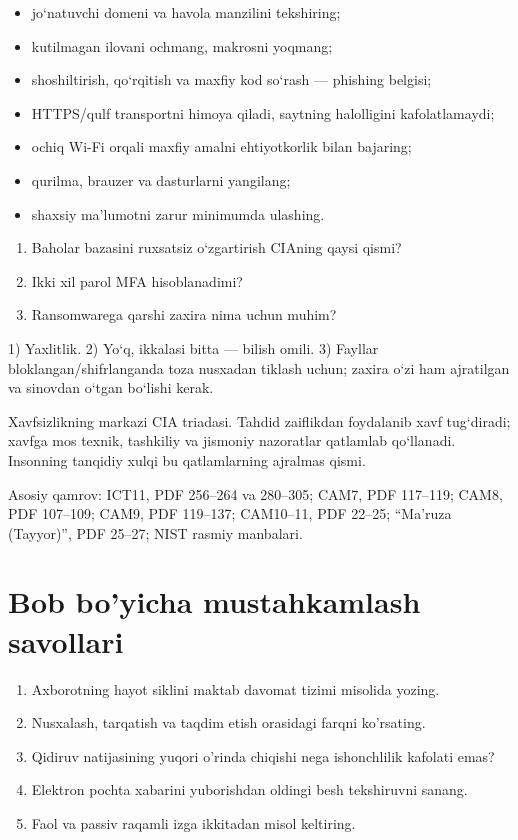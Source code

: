 \documentclass[11pt,a4paper,oneside]{book}
\newcommand{\quickcheck}[1]{\begin{tcolorbox}[colback=white,colframe=Teal,boxrule=.55pt,title={Tezkor tekshiruv}]#1\end{tcolorbox}}
\newcommand{\answers}[1]{\begin{tcolorbox}[colback=Paper,colframe=Muted,boxrule=.4pt,title={Javob va izoh}]\small #1\end{tcolorbox}}
\begin{document}
\begin{itemize}
  \item jo‘natuvchi domeni va havola manzilini tekshiring;
  \item kutilmagan ilovani ochmang, makrosni yoqmang;
  \item shoshiltirish, qo‘rqitish va maxfiy kod so‘rash — phishing belgisi;
  \item HTTPS/qulf transportni himoya qiladi, saytning halolligini kafolatlamaydi;
  \item ochiq Wi-Fi orqali maxfiy amalni ehtiyotkorlik bilan bajaring;
  \item qurilma, brauzer va dasturlarni yangilang;
  \item shaxsiy ma’lumotni zarur minimumda ulashing.
\end{itemize}

\quickcheck{
\begin{enumerate}
  \item Baholar bazasini ruxsatsiz o‘zgartirish CIAning qaysi qismi?
  \item Ikki xil parol MFA hisoblanadimi?
  \item Ransomwarega qarshi zaxira nima uchun muhim?
\end{enumerate}}

\answers{
1) Yaxlitlik. 2) Yo‘q, ikkalasi bitta — bilish omili. 3) Fayllar
bloklangan/shifrlanganda toza nusxadan tiklash uchun; zaxira o‘zi ham
ajratilgan va sinovdan o‘tgan bo‘lishi kerak.}

\begin{summarybox}
Xavfsizlikning markazi CIA triadasi. Tahdid zaiflikdan foydalanib xavf
tug‘diradi; xavfga mos texnik, tashkiliy va jismoniy nazoratlar qatlamlab
qo‘llanadi. Insonning tanqidiy xulqi bu qatlamlarning ajralmas qismi.
\end{summarybox}

\begin{sourcebox}
Asosiy qamrov: ICT11, PDF 256–264 va 280–305; CAM7, PDF 117–119;
CAM8, PDF 107–109; CAM9, PDF 119–137; CAM10–11, PDF 22–25;
``Ma’ruza (Tayyor)'', PDF 25–27; NIST rasmiy manbalari.
\end{sourcebox}
\section{Bob bo'yicha mustahkamlash savollari}
\begin{enumerate}
\item Axborotning hayot siklini maktab davomat tizimi misolida yozing.
\item Nusxalash, tarqatish va taqdim etish orasidagi farqni ko'rsating.
\item Qidiruv natijasining yuqori o'rinda chiqishi nega ishonchlilik kafolati emas?
\item Elektron pochta xabarini yuborishdan oldingi besh tekshiruvni sanang.
\item Faol va passiv raqamli izga ikkitadan misol keltiring.
\end{enumerate}
\end{document}
